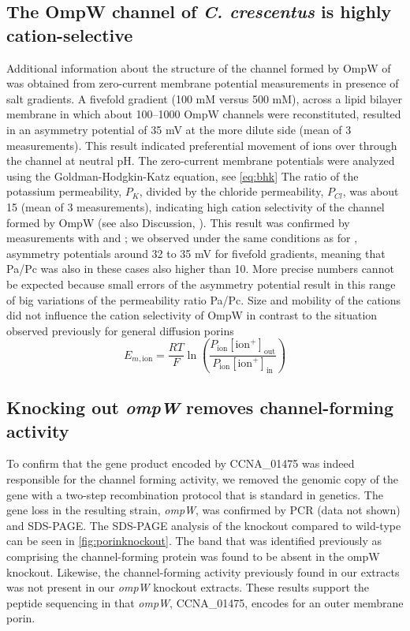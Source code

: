 \subsection{The OmpW channel of \textit{C. crescentus} is highly cation-selective}

Additional information about the structure of the channel formed by OmpW of \caulobacter was obtained from zero-current membrane potential measurements in presence of salt gradients. A fivefold  gradient (100 mM versus 500 mM), across a lipid bilayer membrane in which about 100--1000 OmpW channels were reconstituted, resulted in an asymmetry potential of 35 mV at the more dilute side (mean of 3 measurements). This result indicated preferential movement of  ions over  through the channel at neutral pH. The zero-current membrane potentials were analyzed using the Goldman-Hodgkin-Katz equation, see \cref{eq:bhk} The ratio of the potassium permeability, $P_K$, divided by the chloride permeability, $P_{Cl}$, was about 15 (mean of 3 measurements), indicating high cation selectivity of the channel formed by OmpW (see also Discussion, ). This result was confirmed by measurements with  and ; we observed under the same conditions as for , asymmetry potentials around 32 to 35 mV for fivefold gradients, meaning that Pa/Pc was also in these cases also higher than 10. More precise numbers cannot be expected because small errors of the asymmetry potential result in this range of big variations of the permeability ratio Pa/Pc. Size and mobility of the cations did not influence the cation selectivity of OmpW in contrast to the situation observed previously for general diffusion porins
\begin{equation} \label{eq:bhk}
  E_{m,\text{ion}} = \frac{RT}{F} \ln{ \left( \frac{ P_{\text{ion}}[\text{ion}^{+}]_\mathrm{out}}{ P_{\text{ion}}[\text{ion}^{+}]_\mathrm{in}} \right) }
\end{equation}

\subsection{Knocking out \textit{ompW} removes channel-forming activity} \label{sec:knocking-out-ompw}

To confirm that the gene product encoded by CCNA\_01475 was indeed responsible for the channel forming activity, we removed the genomic copy of the gene with a two-step recombination protocol that is standard in \caulobacter genetics. The gene loss in the resulting strain, \caulobacter \del \textit{ompW}, was confirmed by \ac{PCR} (data not shown) and \ac{SDS-PAGE}. The \ac{SDS-PAGE} analysis of the knockout compared to wild-type can be seen in \cref{fig:porinknockout}. The band that was identified previously as comprising the channel-forming protein was found to be absent in the ompW knockout. Likewise, the channel-forming activity previously found in our extracts was not present in our \textit{ompW} knockout extracts. These results support the peptide sequencing in that \textit{ompW}, CCNA\_01475, encodes for an outer membrane porin.

